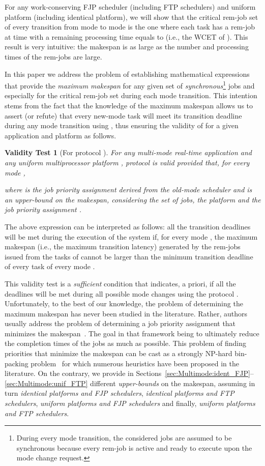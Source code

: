 \documentclass{article}
\newtheorem{validity test}{Validity Test}
\begin{document}
For any work-conserving FJP scheduler (including FTP schedulers) and uniform platform (including identical platform), we will show that the critical rem-job set  of every transition from mode  to mode  is the one where each task  has a rem-job at time  with a remaining processing time equals to  (i.e., the WCET of ). This result is very intuitive: the makespan is as large as the number and processing times of the rem-jobs are large. 

In this paper we address the problem of establishing mathematical expressions that provide the \emph{maximum makespan} for any given set of \emph{synchronous}\footnote{During every mode transition, the considered jobs are assumed to be synchronous because every rem-job is active and ready to execute upon the mode change request.} jobs and especially for the critical rem-job set during each mode transition. This intention stems from the fact that the knowledge of the maximum makespan allows us to assert (or refute) that every new-mode task will meet its transition deadline during any mode transition using , thus ensuring the validity of  for a given application  and platform  as follows. 

\begin{validity test}[For protocol ]
\label{test:Multimode:SMMSO_first}
For any multi-mode real-time application  and any uniform multiprocessor platform , protocol  is valid provided that, for every mode ,

\noindent where  is the job priority assignment derived from the old-mode scheduler  and  is an upper-bound on the makespan, considering the set  of jobs, the platform  and the job priority assignment . 
\end{validity test}

The above expression can be interpreted as follows: all the transition deadlines will be met during the execution of the system if, for every mode , the maximum makespan (i.e., the maximum transition latency) generated by the rem-jobs issued from the tasks of  cannot be larger than the minimum transition deadline of every task of every mode . 

This validity test is a \emph{sufficient} condition that indicates, a priori, if all the deadlines will be met during all possible mode changes using the protocol . Unfortunately, to the best of our knowledge, the problem of determining the maximum makespan has never been studied in the literature. Rather, authors usually address the problem of determining a job priority assignment that minimizes the makespan~\cite{Goyal:05, Garey:90}. The goal in that framework being to ultimately reduce the completion times of the jobs as much as possible. This problem of finding priorities that minimize the makespan can be cast as a strongly NP-hard bin-packing problem~\cite{Goyal:05, Garey:90} for which numerous heuristics have been proposed in the literature. On the contrary, we provide in Sections~\ref{sec:Multimode:ident_FJP}--\ref{sec:Multimode:unif_FTP} different \emph{upper-bounds} on the makespan, assuming in turn {\em identical platforms and FJP schedulers}, {\em identical platforms and FTP schedulers}, {\em uniform platforms and FJP schedulers} and finally, {\em uniform platforms and FTP schedulers}. 
\end{document}
